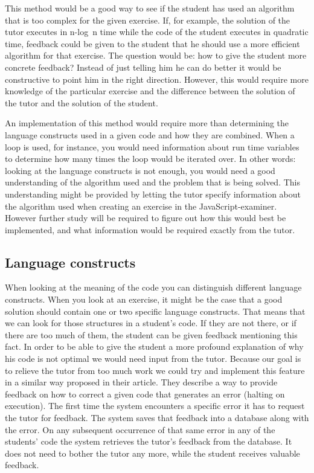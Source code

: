 This method would be a good way to see if the student has used an algorithm
that is too complex for the given exercise. If, for example, the solution of
the tutor executes in n-log~n time while the code of the student executes in
quadratic time, feedback could be given to the student that he should use a
more efficient algorithm for that exercise. The question would be: how to give
the student more concrete feedback? Instead of just telling him he can do
better it would be constructive to point him in the right direction. However,
this would require more knowledge of the particular exercise and the difference
between the solution of the tutor and the solution of the student.

An implementation of this method would require more than determining the
language constructs used in a given code and how they are combined. When a loop
is used, for instance, you would need information about run time variables to
determine how many times the loop would be iterated over. In other words:
looking at the language constructs is not enough, you would need a good
understanding of the algorithm used and the problem that is being solved. This
understanding might be provided by letting the tutor specify information about
the algorithm used when creating an exercise in the
JavaScript-examiner. However further study will be required to figure out how
this would best be implemented, and what information would be required exactly
from the tutor.

\subsection{Language constructs}

When looking at the meaning of the code you can distinguish different language
constructs. When you look at an exercise, it might be the case that a good
solution should contain one or two specific language constructs. That means
that we can look for those structures in a student's code. If they are not
there, or if there are too much of them, the student can be given feedback
mentioning this fact. In order to be able to give the student a more profound
explanation of why his code is not optimal we would need input from the
tutor. Because our goal is to relieve the tutor from too much work we could try
and implement this feature in a similar way \citet[Section
3.2]{watson2011learning} proposed in their article. They describe a way to
provide feedback on how to correct a given code that generates an error
(halting on execution). The
first time the system encounters a specific error it has to request the tutor
for feedback. The system saves that feedback into a database along with the
error. On any subsequent occurrence of that same error in any of the students'
code the system retrieves the tutor's feedback from the database. It does not
need to bother the tutor any more, while the student receives valuable
feedback.

